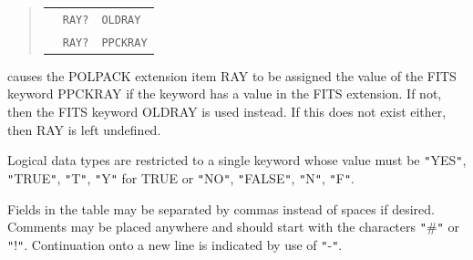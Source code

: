 \documentclass[twoside,11pt]{starlink}
\begin{document}
{{\begin{quote}
\begin{tabular}{lll}
              &  \texttt{RAY?}          & \texttt{OLDRAY} \\
              &  \texttt{RAY?}          & \texttt{PPCKRAY}
\end{tabular}
\end{quote}

      causes the POLPACK extension item RAY to be assigned the value of the
      FITS keyword PPCKRAY if the keyword has a value in the FITS
      extension. If not, then the FITS keyword OLDRAY is used instead. If
      this does not exist either, then RAY is left undefined.

      Logical data types are restricted to a single keyword whose value
      must be \texttt{"}YES\texttt{"}, \texttt{"}TRUE\texttt{"}, \texttt{"}T\texttt{"}, \texttt{"}Y\texttt{"} for TRUE or \texttt{"}NO\texttt{"}, \texttt{"}FALSE\texttt{"}, \texttt{"}N\texttt{"},
      \texttt{"}F\texttt{"}.

      Fields in the table may be separated by commas instead of spaces if
      desired. Comments may be placed anywhere and should start with the
      characters \texttt{"}\#\texttt{"} or \texttt{"}!\texttt{"}. Continuation onto
      a new line is indicated by use of \texttt{"}-\texttt{"}.
   }
}
\end{document}
